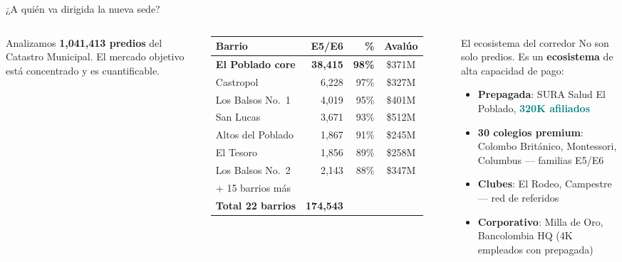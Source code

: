 \documentclass[aspectratio=169, 11pt]{beamer}
\newcommand{\highlight}[1]{\textcolor{teal}{\textbf{#1}}}
\newcommand{\src}[1]{\par\vspace{2pt}{\tiny\textcolor{slate}{Fuente: #1}}}
\begin{document}
\begin{frame}{¿A quién va dirigida la nueva sede?}

\begin{columns}[T]
{\small Analizamos \textbf{1,041,413 predios} del Catastro Municipal.
El mercado objetivo está concentrado y es cuantificable.}

\vspace{4pt}
{\scriptsize
\begin{tabular}{@{}lrrc@{}}
\toprule
\textbf{Barrio} & \textbf{E5/E6} & \textbf{\%} & \textbf{Avalúo} \\
\midrule
\rowcolor{teal!8}
\textbf{El Poblado core} & \textbf{38,415} & \textbf{98\%} & \$371M \\
Castropol & 6,228 & 97\% & \$327M \\
Los Balsos No.\ 1 & 4,019 & 95\% & \$401M \\
San Lucas & 3,671 & 93\% & \$512M \\
\rowcolor{teal!6}
Altos del Poblado & 1,867 & 91\% & \$245M \\
El Tesoro & 1,856 & 89\% & \$258M \\
Los Balsos No.\ 2 & 2,143 & 88\% & \$347M \\
{\tiny + 15 barrios más} & & & \\
\midrule
\textbf{Total 22 barrios} & \textbf{174,543} & & \\
\bottomrule
\end{tabular}
}

\vspace{2pt}
\src{Catastro Municipal Medellín (bp59-rj8r), 1,041,413 predios}

\vspace{2pt}
\begin{exampleblock}{\small El ecosistema del corredor}
\footnotesize
No son solo predios. Es un \textbf{ecosistema} de alta capacidad de pago:

\vspace{3pt}
\begin{itemize}\setlength{\itemsep}{1pt}
  \item \textbf{Prepagada}: SURA Salud El Poblado, \highlight{320K afiliados}
  \item \textbf{30 colegios premium}: Colombo Británico, Montessori, Columbus --- familias E5/E6
  \item \textbf{Clubes}: El Rodeo, Campestre --- red de referidos
  \item \textbf{Corporativo}: Milla de Oro, Bancolombia HQ (4K empleados con prepagada)
\end{itemize}
\end{exampleblock}


\end{columns}
\end{frame}
\end{document}
